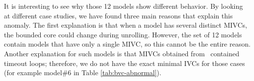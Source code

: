       It is interesting to see why those 12 models show different behavior. By looking at different case studies, we have found three main reasons that explain this anomaly.  The first explanation is that when a model has several distinct MIVCs, the bounded core could change during unrolling. However, the set of 12 models contain models that have only a single MIVC, so this cannot be the entire reason. Another explanation for such models is that MIVCs obtained from \aivcalg ~contained timeout loops; therefore, we do not have the exact minimal IVCs for those cases (for example model\#6 in Table \ref{tab:bvc-abnormal}).







